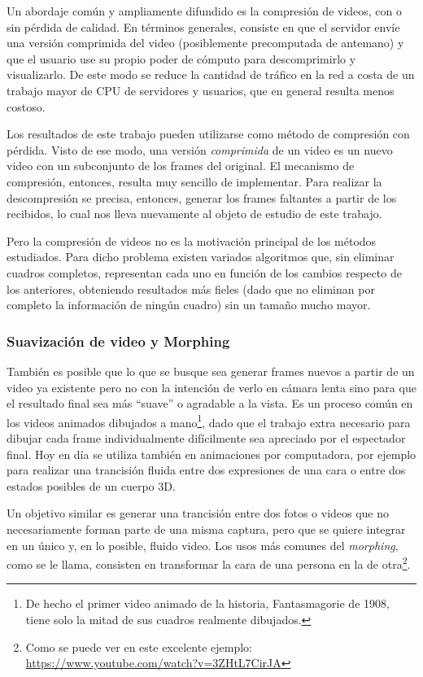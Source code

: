 Un abordaje común y ampliamente difundido es la compresión de videos, con o sin pérdida de calidad. En términos generales, consiste en que el servidor envíe una versión comprimida del video (posiblemente precomputada de antemano) y que el usuario use su propio poder de cómputo para descomprimirlo y visualizarlo. De este modo se reduce la cantidad de tráfico en la red a costa de un trabajo mayor de CPU de servidores y usuarios, que en general resulta menos costoso.

Los resultados de este trabajo pueden utilizarse como método de compresión con pérdida. Visto de ese modo, una versión \emph{comprimida} de un video es un nuevo video con un subconjunto de los frames del original. El mecanismo de compresión, entonces, resulta muy sencillo de implementar. Para realizar la descompresión se precisa, entonces, generar los frames faltantes a partir de los recibidos, lo cual nos lleva nuevamente al objeto de estudio de este trabajo.

Pero la compresión de videos no es la motivación principal de los métodos estudiados. Para dicho problema existen variados algoritmos que, sin eliminar cuadros completos, representan cada uno en función de los cambios respecto de los anteriores, obteniendo resultados más fieles (dado que no eliminan por completo la información de ningún cuadro) sin un tamaño mucho mayor\cite{wiki_data_compression_video}.

\subsubsection{Suavización de video y Morphing}
También es posible que lo que se busque sea generar frames nuevos a partir de un video ya existente pero no con la intención de verlo en cámara lenta sino para que el resultado final sea más ``suave'' o agradable a la vista. Es un proceso común en los videos animados dibujados a mano\footnote{De hecho el primer video animado de la historia, Fantasmagorie de 1908, tiene solo la mitad de sus cuadros realmente dibujados.}, dado que el trabajo extra necesario para dibujar cada frame individualmente difícilmente sea apreciado por el espectador final. Hoy en día se utiliza también en animaciones por computadora, por ejemplo para realizar una trancisión fluida entre dos expresiones de una cara o entre dos estados posibles de un cuerpo 3D.

Un objetivo similar es generar una trancisión entre dos fotos o videos que no necesariamente forman parte de una misma captura, pero que se quiere integrar en un único y, en lo posible, fluido video. Los usos más comunes del \emph{morphing}, como se le llama, consisten en transformar la cara de una persona en la de otra\footnote{Como se puede ver en este excelente ejemplo: \url{https://www.youtube.com/watch?v=3ZHtL7CirJA}}.

